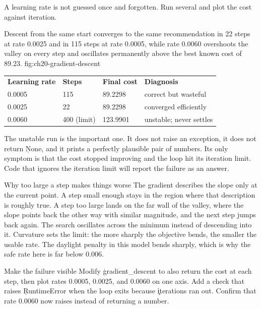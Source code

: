 
A learning rate is not guessed once and forgotten. Run several and plot the
cost against iteration.

{Descent from the same start converges to the same recommendation in 22 steps at rate 0.0025 and in 115 steps at rate 0.0005, while rate 0.0060 overshoots the valley on every step and oscillates permanently above the best known cost of 89.23.}
{fig:ch20-gradient-descent}

\begin{center}
\begin{tabular}{llll}
\textbf{Learning rate} & \textbf{Steps} & \textbf{Final cost} & \textbf{Diagnosis} \\
0.0005 & 115 & 89.2298 & correct but wasteful \\
0.0025 & 22 & 89.2298 & converged efficiently \\
0.0060 & 400 (limit) & 123.9901 & unstable; never settles \\
\end{tabular}
\end{center}

The unstable run is the important one. It does not raise an exception, it does
not return \c{None}, and it prints a perfectly plausible pair of numbers. Its
only symptom is that the cost stopped improving and the loop hit its iteration
limit. Code that ignores the iteration limit will report the failure as an
answer.

\begin{ExplainBox}{Why too large a step makes things worse}
The gradient describes the slope only at the current point. A step small enough
stays in the region where that description is roughly true. A step too large
lands on the far wall of the valley, where the slope points back the other way
with similar magnitude, and the next step jumps back again. The search
oscillates across the minimum instead of descending into it. Curvature sets the
limit: the more sharply the objective bends, the smaller the usable rate. The
daylight penalty in this model bends sharply, which is why the safe rate here
is far below 0.006.
\end{ExplainBox}

\begin{TryBox}{Make the failure visible}
Modify \c{gradient_descent} to also return the cost at each step, then plot
rates 0.0005, 0.0025, and 0.0060 on one axis. Add a check that raises
\c{RuntimeError} when the loop exits because \c{iterations} ran out. Confirm
that rate 0.0060 now raises instead of returning a number.
\end{TryBox}

